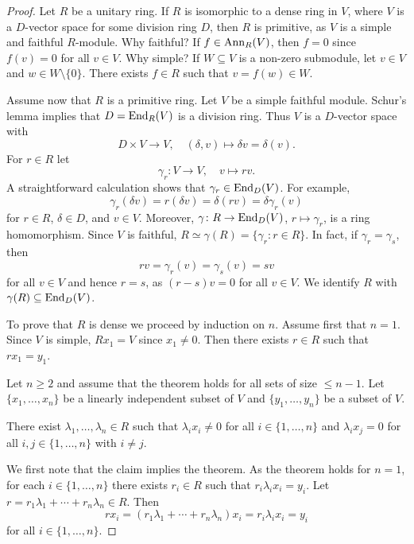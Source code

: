 \begin{proof}
    Let $R$ be a unitary ring. 
    If $R$ is isomorphic to a dense ring in $V$, where
	$V$ is a $D$-vector space for some division ring $D$, then $R$
	is primitive, as $V$ is a simple and faithful $R$-module. Why faithful? If 
	$f\in\operatorname{Ann}_R(V)$, then $f=0$ since $f(v)=0$ for all $v\in V$. Why simple? 
	If $W\subseteq V$ is a non-zero submodule, let $v\in V$ and $w\in
	W\setminus\{0\}$. There exists $f\in R$ such that $v=f(w)\in W$. 

   Assume now that $R$ is a primitive ring. 
   Let $V$ be a simple faithful module.
	Schur's lemma implies that $D=\operatorname{End}_R(V)$ is a division ring. Thus $V$ is
	a $D$-vector space with 
	\[
	D\times V\to V,\quad
	(\delta,v)\mapsto \delta v=\delta(v).
	\]
	For $r\in R$ let  
	\[
		\gamma_r\colon V\to V,\quad
		v\mapsto rv.
	\]
	A straightforward calculation shows that $\gamma_r\in\operatorname{End}_D(V)$. For example, 
    \[
    \gamma_r(\delta v)=r(\delta v)=\delta(rv)=\delta\gamma_r(v)
    \]
    for $r\in R$, $\delta\in D$, and $v\in V$. 
    Moreover, 
    $\gamma\colon R\to\operatorname{End}_D(V)$,
	$r\mapsto\gamma_r$, is a ring homomorphism. Since $V$ is faithful,
	$R\simeq\gamma(R)=\{\gamma_r:r\in R\}$. In fact, if $\gamma_r=\gamma_s$, then 
	\[
    rv=\gamma_r(v)=\gamma_s(v)=sv
    \] 
    for all $v\in V$ and hence $r=s$, as
	$(r-s)v=0$ for all $v\in V$. We identify $R$ with $\gamma(R)\subseteq\operatorname{End}_D(V)$.

    To prove that $R$ is dense we proceed by induction on $n$. Assume first that
    $n=1$. Since $V$ is simple, $Rx_1=V$ since $x_1\ne 0$. Then there
    exists $r\in R$ such that $rx_1=y_1$. 

    Let $n\geq2$ and assume that the theorem holds for all sets of size $\leq n-1$. 
    Let $\{x_1,\dots,x_{n}\}$ be a linearly independent subset of $V$ and 
    $\{y_1,\dots,y_{n}\}$ be a subset of $V$. 

    \begin{claim}
        There exist $\lambda_1,\dots,\lambda_n\in R$ such 
        that $\lambda_ix_i\ne 0$ for all $i\in\{1,\dots,n\}$ and 
        $\lambda_ix_j=0$ for all $i,j\in\{1,\dots,n\}$ with $i\ne j$. 
    \end{claim}

    We first note that the claim implies the theorem. As the theorem holds for $n=1$, 
    for each $i\in\{1,\dots,n\}$ 
    there exists $r_i\in R$ such that $r_i\lambda_ix_i=y_i$. Let 
    $r=r_1\lambda_1+\cdots+r_n\lambda_n\in R$. Then
    \[
    rx_i=(r_1\lambda_1+\cdots+r_n\lambda_n)x_i=r_i\lambda_ix_i=y_i
    \]
    for all $i\in\{1,\dots,n\}$. 


\end{proof}
